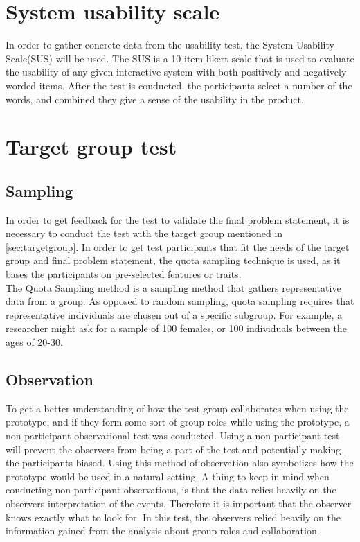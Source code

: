 \section{System usability scale}\label{sus}
In order to gather concrete data from the usability test, the System Usability Scale(SUS)\cite{susScale} will be used. The SUS is a 10-item likert scale that is used to evaluate the usability of any given interactive system with both positively and negatively worded items. After the test is conducted, the participants select a number of the words, and combined they give a sense of the usability in the product\cite{susScale}.

\section{Target group test}

\subsection{Sampling}
In order to get feedback for the test to validate the final problem statement, it is necessary to conduct the test with the target group mentioned in \autoref{sec:targetgroup}. In order to get test participants that fit the needs of the target group and final problem statement, the quota sampling technique is used, as it bases the participants on pre-selected features or traits.\\

The Quota Sampling method is a sampling method that gathers representative data from a group.\cite{quotaSamp} As opposed to random sampling, quota sampling requires that representative individuals are chosen out of a specific subgroup\cite{quotaSamp}. For example, a researcher might ask for a sample of 100 females, or 100 individuals between the ages of 20-30\cite{quotaSamp}.

\subsection{Observation}\label{sec:observationalTest}
To get a better understanding of how the test group collaborates when using the prototype, and if they form some sort of group roles while using the prototype, a non-participant observational test was conducted\cite[p.~64-67]{bjoernerBog}. Using a non-participant test will prevent the observers from being a part of the test and potentially making the participants biased. Using this method of observation also symbolizes how the prototype would be used in a natural setting. A thing to keep in mind when conducting non-participant observations, is that the data relies heavily on the observers interpretation of the events. Therefore it is important that the observer knows exactly what to look for. In this test, the observers relied heavily on the information gained from the analysis about group roles and collaboration\cite[p.~64-67]{bjoernerBog}.\\\\


